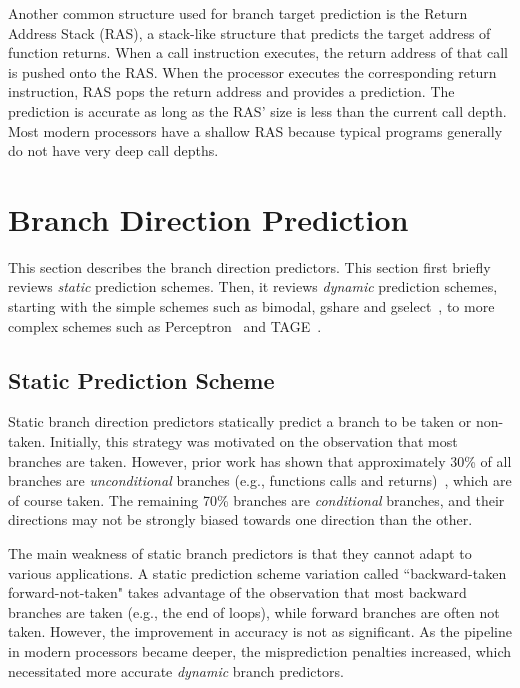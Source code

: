 Another common structure used for branch target prediction is the Return Address Stack (RAS),  a stack-like structure that predicts the target address of function returns. When a call instruction executes, the return address of that call is pushed onto the RAS. When the processor executes the corresponding return instruction, RAS pops the return address and provides a prediction. The prediction is accurate as long as the RAS' size is less than the current call depth. Most modern processors have a shallow RAS because typical programs generally do not have very deep call depths.


\section{Branch Direction Prediction}
\label{sec:background:dirpred}
This section describes the branch direction predictors. This section first briefly reviews \textit{static} prediction schemes. Then, it reviews \textit{dynamic} prediction schemes, starting with the simple schemes such as bimodal, gshare and gselect~\cite{McFarling}, to more complex schemes such as Perceptron~\cite{perceptron} and TAGE~\cite{tage}.

\subsection{Static Prediction Scheme}
\label{sec:background:dirpred:static}
Static branch direction predictors statically predict a branch to be taken or non-taken. Initially, this strategy was motivated on the observation that most branches are taken. However, prior work has shown that approximately 30\% of all branches are \textit{unconditional} branches (e.g., functions calls and returns)~\cite{histogram}, which are of course taken. The remaining 70\% branches are \textit{conditional} branches, and their directions may not be strongly biased towards one direction than the other.

The main weakness of static branch predictors is that they cannot adapt to various applications. A static prediction scheme variation called ``backward-taken forward-not-taken" takes advantage of the observation that most backward branches are taken (e.g., the end of loops), while forward branches are often not taken. However, the improvement in accuracy is not as significant. As the pipeline in modern processors became deeper, the misprediction penalties increased, which necessitated more accurate \textit{dynamic} branch predictors.

